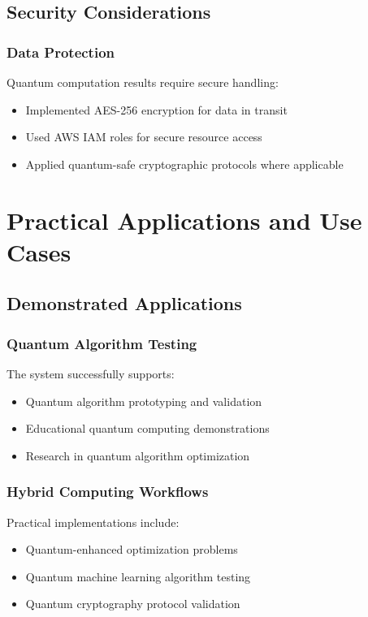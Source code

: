 \documentclass[conference]{IEEEtran}
\begin{document}
\subsection{Security Considerations}

\subsubsection{Data Protection}
Quantum computation results require secure handling:
\begin{itemize}
    \item Implemented AES-256 encryption for data in transit
    \item Used AWS IAM roles for secure resource access
    \item Applied quantum-safe cryptographic protocols where applicable
\end{itemize}

\section{Practical Applications and Use Cases}

\subsection{Demonstrated Applications}

\subsubsection{Quantum Algorithm Testing}
The system successfully supports:
\begin{itemize}
    \item Quantum algorithm prototyping and validation
    \item Educational quantum computing demonstrations
    \item Research in quantum algorithm optimization
\end{itemize}

\subsubsection{Hybrid Computing Workflows}
Practical implementations include:
\begin{itemize}
    \item Quantum-enhanced optimization problems
    \item Quantum machine learning algorithm testing
    \item Quantum cryptography protocol validation
\end{itemize}
\end{document}
